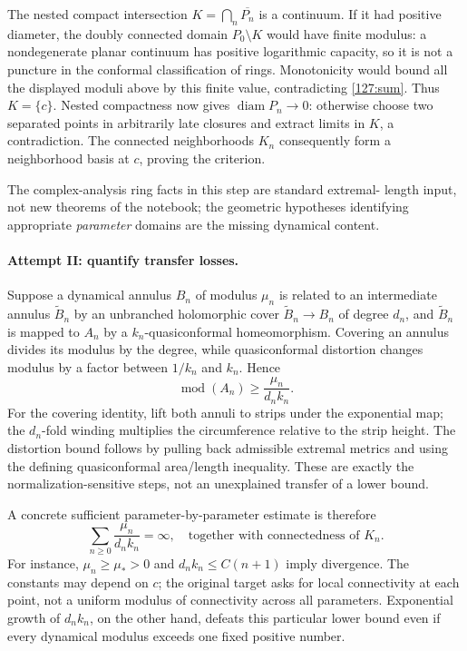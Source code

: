 \documentclass[11pt,a4paper]{article}
\numberwithin{equation}{section}
\begin{document}
The nested compact intersection $K=\bigcap_n\overline{P_n}$ is a
continuum.  If it had positive diameter, the doubly connected domain
$P_0\setminus K$ would have finite modulus: a nondegenerate planar
continuum has positive logarithmic capacity, so it is not a puncture
in the conformal classification of rings.  Monotonicity would bound
all the displayed moduli above by this finite value, contradicting
\eqref{127:sum}.  Thus $K=\{c\}$.  Nested compactness now gives
$\operatorname{diam}P_n\to0$: otherwise choose two separated points
in arbitrarily late closures and extract limits in $K$, a contradiction.
The connected neighborhoods $K_n$ consequently form a neighborhood
basis at $c$, proving the criterion.

The complex-analysis ring facts in this step are standard extremal-
length input, not new theorems of the notebook; the geometric
hypotheses identifying appropriate \emph{parameter} domains are the
missing dynamical content.

\paragraph{Attempt II: quantify transfer losses.}
Suppose a dynamical annulus $B_n$ of modulus $\mu_n$ is related to an
intermediate annulus $\widetilde B_n$ by an unbranched holomorphic
cover $\widetilde B_n\to B_n$ of degree $d_n$, and $\widetilde B_n$ is mapped to $A_n$ by a
$k_n$-quasiconformal homeomorphism.  Covering an annulus divides its
modulus by the degree, while quasiconformal distortion changes modulus
by a factor between $1/k_n$ and $k_n$.  Hence
\begin{equation}\label{127:loss}
 \operatorname{mod}(A_n)\geq\frac{\mu_n}{d_n k_n}.
\end{equation}
For the covering identity, lift both annuli to strips under the
exponential map; the $d_n$-fold winding multiplies the circumference
relative to the strip height.  The distortion bound follows by pulling
back admissible extremal metrics and using the defining quasiconformal
area/length inequality.  These are exactly the normalization-sensitive
steps, not an unexplained transfer of a lower bound.

A concrete sufficient parameter-by-parameter estimate is therefore
\begin{equation}\label{127:target}
 \sum_{n\geq0}\frac{\mu_n}{d_n k_n}=\infty,
 \quad\text{together with connectedness of }K_n.
\end{equation}
For instance, $\mu_n\geq\mu_*>0$ and
$d_nk_n\leq C(n+1)$ imply divergence.  The constants may depend on
$c$; the original target asks for local connectivity at each point,
not a uniform modulus of connectivity across all parameters.
Exponential growth of $d_nk_n$, on the other hand, defeats this
particular lower bound even if every dynamical modulus exceeds one
fixed positive number.
\end{document}
